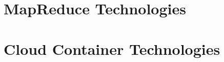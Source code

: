 \documentclass{format/laszewski}
\begin{document}
\maketitle



\part{MapReduce Technologies}




\part{Cloud Container Technologies}










%








%
%
%
%

 
%
%
%

%



%
%
%


\begin{comment}

















\end{comment}
\end{document}
